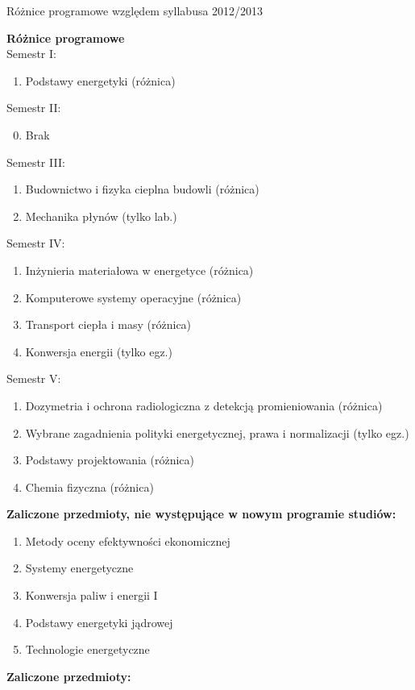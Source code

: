 \documentclass[a4paper,12pt]{article}
\begin{document}
\begin{center}
\Large{Różnice programowe względem syllabusa 2012/2013}
\end{center}
\vspace{20pt}
\textbf{Różnice programowe}\\
Semestr I:
\begin{enumerate}
\item Podstawy energetyki (różnica)
\end{enumerate}
Semestr II:
\begin{enumerate}
\setcounter{enumi}{-1}
\item Brak
\end{enumerate}
Semestr III:
\begin{enumerate}
\item Budownictwo i fizyka cieplna budowli (różnica)
\item Mechanika płynów (tylko lab.)
\end{enumerate}
Semestr IV:
\begin{enumerate}
\item Inżynieria materiałowa w energetyce (różnica)
\item Komputerowe systemy operacyjne (różnica)
\item Transport ciepła i masy (różnica)
\item Konwersja energii (tylko egz.)
\end{enumerate}
Semestr V:
\begin{enumerate}
\item Dozymetria i ochrona radiologiczna z detekcją promieniowania (różnica)
\item Wybrane zagadnienia polityki energetycznej, prawa i normalizacji (tylko egz.)
\item Podstawy projektowania (różnica)
\item Chemia fizyczna (różnica)
\end{enumerate}
\vspace{20pt}
\textbf{Zaliczone przedmioty, nie występujące w nowym programie studiów:}
\begin{enumerate}
\item Metody oceny efektywności ekonomicznej
\item Systemy energetyczne
\item Konwersja paliw i energii I
\item Podstawy energetyki jądrowej
\item Technologie energetyczne
\end{enumerate}
\newpage
\textbf{Zaliczone przedmioty:}
\end{document}
